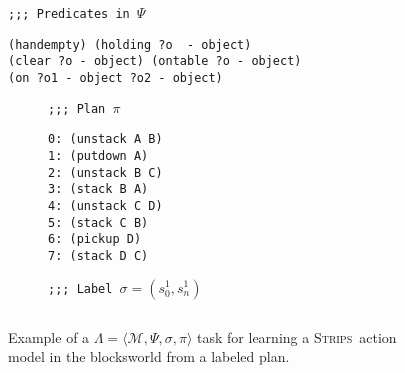 \documentclass[3p,times]{elsarticle}
\newcommand{\strips}{\textsc{Strips}}     %
\newcommand{\tup}[1]{{\langle #1 \rangle}}
\begin{document}
\begin{figure}[hbt!]
{\tt ;;; Predicates in $\Psi$}
\begin{footnotesize}
\begin{verbatim}
(handempty) (holding ?o  - object)
(clear ?o - object) (ontable ?o - object)
(on ?o1 - object ?o2 - object)
\end{verbatim}
\end{footnotesize}

\vspace{0.2cm}

\begin{subfigure}{.25\textwidth}
{\tt ;;; Plan $\pi$}
\begin{footnotesize}
\begin{verbatim}
0: (unstack A B)
1: (putdown A)
2: (unstack B C)
3: (stack B A)
4: (unstack C D)
5: (stack C B)
6: (pickup D)
7: (stack D C)
\end{verbatim}
\end{footnotesize}
\end{subfigure}%
\begin{subfigure}{.6\textwidth}
{\tt ;;; Label $\sigma=(s_0^1,s_{n}^1)$}
\begin{lstlisting}[mathescape]
\end{lstlisting}
\vspace{0.1cm}
\vspace{0.6cm}
\end{subfigure}%
 \caption{\small Example of a $\Lambda=\tup{\mathcal{M},\Psi,\sigma,\pi}$ task for learning a \strips\ action model in the blocksworld from a labeled plan.}
\label{fig:example-lplan}
\end{figure}
\end{document}
